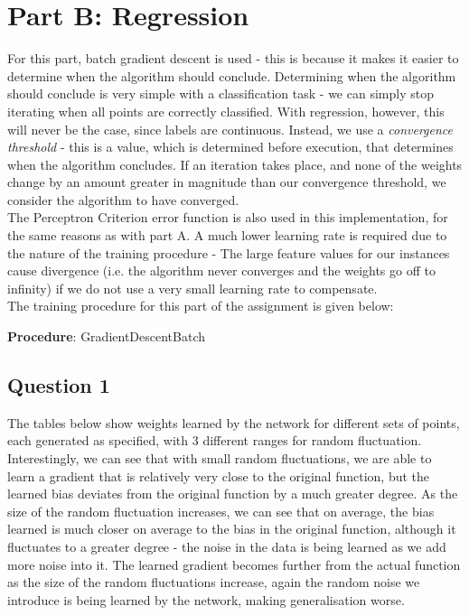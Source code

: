 \documentclass{article}
\begin{document}
\section*{Part B: Regression}
For this part, batch gradient descent is used - this is because it makes it easier to determine when the algorithm should conclude. Determining when the algorithm should conclude is very simple with a classification task - we can simply stop iterating when all points are correctly classified. With regression, however, this will never be the case, since labels are continuous. Instead, we use a \emph{convergence threshold} - this is a value, which is determined before execution, that determines when the algorithm concludes. If an iteration takes place, and none of the weights change by an amount greater in magnitude than our convergence threshold, we consider the algorithm to have converged. \\
\indent The Perceptron Criterion error function is also used in this implementation, for the same reasons as with part A.
A much lower learning rate is required due to the nature of the training procedure - The large feature values for our instances cause divergence (i.e. the algorithm never converges and the weights go off to infinity) if we do not use a very small learning rate to compensate. \\
\indent The training procedure for this part of the assignment is given below:

\vspace{4mm}
\begin{algorithm}[H]{\textbf{Procedure}: GradientDescentBatch} \\
    \SetAlgoLined
\end{algorithm}
\vspace{4mm}
\subsection*{Question 1}

The tables below show weights learned by the network for different sets of points, each generated as specified, with 3 different ranges for random fluctuation. Interestingly, we can see that with small random fluctuations, we are able to learn a gradient that is relatively very close to the original function, but the learned bias deviates from the original function by a much greater degree. As the size of the random fluctuation increases, we can see that on average, the bias learned is much closer on average to the bias in the original function, although it fluctuates to a greater degree - the noise in the data is being learned as we add more noise into it. The learned gradient becomes further from the actual function as the size of the random fluctuations increase, again the random noise we introduce is being learned by the network, making generalisation worse.
\end{document}
